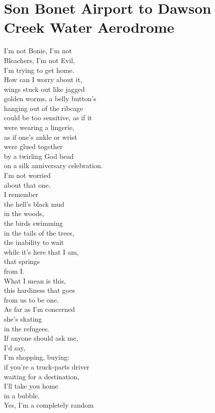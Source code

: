 \documentclass[smalldemyvopaper,11pt,twoside,onecolumn,openright,extrafontsizes]{memoir}
\begin{document}
\chapter{Son Bonet Airport to Dawson Creek Water Aerodrome}
I'm not Bonie, I'm not
\\Bleachers, I'm not Evil,
\\I'm trying to get home.
\\How can I worry about it,
\\wings stuck out like jagged
\\golden worms, a belly button's
\\hanging out of the ribcage
\\could be too sensitive, as if it
\\were wearing a lingerie,
\\as if one's ankle or wrist
\\were glued together
\\by a twirling God bead
\\on a silk anniversary celebration.
\\I'm not worried
\\about that one.
\\I remember
\\the hell's black mud
\\in the woods,
\\the birds swimming
\\in the tails of the trees,
\\the inability to wait
\\while it's here that I am,
\\that springs
\\from I.
\\What I mean is this,
\\this hardiness that goes
\\from us to be one.
\\As far as I'm concerned
\\she's skating
\\in the refugees.
\\If anyone should ask me,
\\I'd say,
\\I'm shopping, buying:
\\if you're a truck-parts driver
\\waiting for a destination,
\\I'll take you home
\\in a bubble.
\\Yes, I'm a completely random
\end{document}
